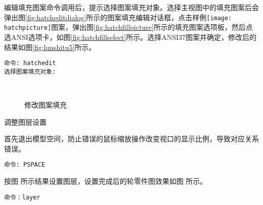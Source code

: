 \begin{procedure}
\begin{enumerate}
编辑填充图案命令调用后，提示选择图案填充对象。选择主视图中的填充图案后会弹出图\ref{fig:hatcheditdialog}所示的图案填充编辑对话框，点击样例\texttt{[image: hatchpicture]}图案，弹出图\ref{fig:hatchfillpicture}所示的填充图案选项板，然后点选ANSI选项卡，如图\ref{fig:hatchfillselect}所示。选择ANSI37图案并确定，修改后的结果如图\ref{fig:lunshitu5}所示。
\begin{lstlisting}
命令: hatchedit
选择图案填充对象:
\end{lstlisting}

\begin{figure}[htbp]
\centering
{}\hspace{20pt}
\\
\hspace{20pt}
\caption{修改图案填充}
\end{figure}

\end{enumerate}
\item 调整图层设置

首先退出模型空间，防止错误的鼠标缩放操作改变视口的显示比例，导致对应关系错误。

\begin{lstlisting}
命令: PSPACE
\end{lstlisting}

按图 所示结果设置图层，设置完成后的轮零件图效果如图 所示。
\begin{lstlisting}
命令：layer
\end{lstlisting}

\begin{figure}[htbp]
\centering
\begin{floatrow}[2]
\end{floatrow}
\end{figure}

\end{procedure}
